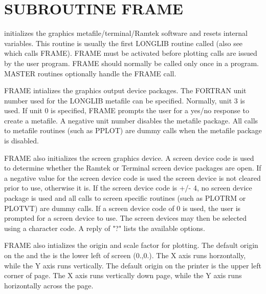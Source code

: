 \documentclass[11pt]{report}
\begin{document}
\section{SUBROUTINE FRAME}

 initializes the graphics metafile/terminal/Ramtek software  and
resets internal  variables.  This routine is usually the first LONGLIB
routine called (also see  which calls FRAME).  FRAME must be activated
before plotting calls are issued by the user program.  FRAME should
normally be called only once in a program.  MASTER routines optionally
handle the FRAME call.

FRAME intializes the graphics output device packages.  The FORTRAN
unit number used for the LONGLIB metafile can be specified.  Normally,
unit 3 is used.  If unit 0 is specified, FRAME prompts the user
for a yes/no response to create a metafile.  A negative unit number
disables the metafile package.  All calls to metafile routines (such
as PPLOT) are dummy calls when the metafile package is disabled.

FRAME also initializes the screen graphics device.  A screen device
code is used to determine whether the Ramtek or Terminal screen device
packages are open.  If a negative value for the screen device code
is used the screen device is not cleared prior to use, otherwise it is.
If the screen device code is +/- 4, no screen device package is used and
all calls to screen
specific routines (such as PLOTRM or PLOTVT) are dummy calls.
If a screen device code of 0 is used, the user is prompted for 
a screen device to use.  The screen devices may then be selected using
a character code.  A reply of "?" lists the available options.

FRAME also intializes the origin and scale factor for plotting.
The default origin on the  and the  is the lower
left of screen (0.,0.).  The X axis runs horzontally, while the Y axis
runs vertically.  The default origin on the printer is the upper left
corner of page.  The X axis runs vertically down page, while the Y axis runs
horizontally across the page.
\end{document}
